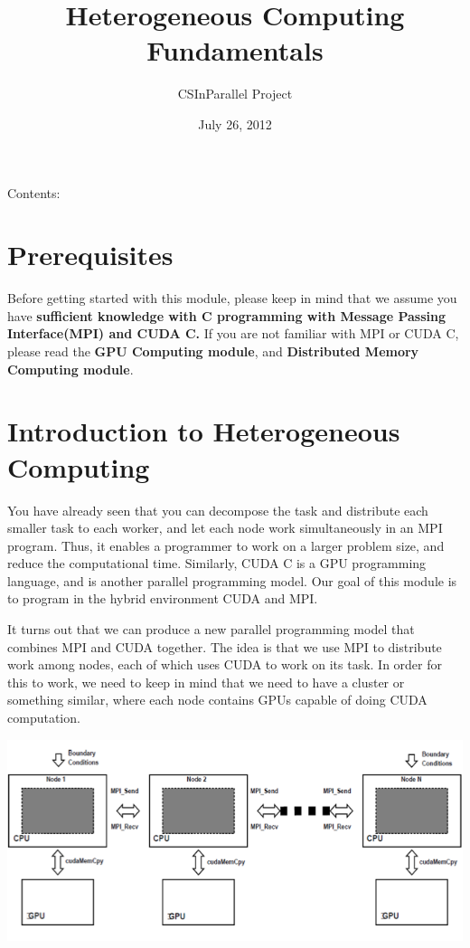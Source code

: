 \documentclass[letterpaper,10pt,openany,oneside]{sphinxmanual}
\title{Heterogeneous Computing Fundamentals}
\date{July 26, 2012}
\author{CSInParallel Project}
\begin{document}
\maketitle
\tableofcontents
{}\label{index::doc}


Contents:


\chapter{Prerequisites}
\label{Prerequisites/Prerequisites:prerequisites}\label{Prerequisites/Prerequisites:heterogeneous-computing-fundamentals}\label{Prerequisites/Prerequisites::doc}
Before getting started with this module, please keep in mind that we assume you have \textbf{sufficient knowledge with C programming with Message Passing Interface(MPI) and CUDA C.} If you are not familiar with MPI or CUDA C, please read the \textbf{GPU Computing module}, and \textbf{Distributed Memory Computing module}.


\chapter{Introduction to Heterogeneous Computing}
\label{IntroHeterogeneous/IntroHeterogeneous::doc}\label{IntroHeterogeneous/IntroHeterogeneous:introduction-to-heterogeneous-computing}
You have already seen that you can decompose the task and distribute each smaller task to each worker, and let each node work simultaneously in an MPI program. Thus, it enables a programmer to work on a larger problem size, and reduce the computational time. Similarly, CUDA C is a GPU programming language, and is another parallel programming model. Our goal of this module is to program in the hybrid environment CUDA and MPI.

It turns out that we can produce a new parallel programming model that combines MPI and CUDA together. The idea is that we use MPI to distribute work among nodes, each of which uses CUDA to work on its task. In order for this to work, we need to keep in mind that we need to have a cluster or something similar, where each node contains GPUs capable of doing CUDA computation.

{\hfill\includegraphics{cudampi.png}\hfill}
\end{document}

